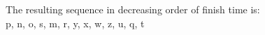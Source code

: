 \documentclass[addpoints,11pt]{exam}
\begin{document}
\begin{questions}
\begin{solutionorbox}
The resulting sequence in decreasing order of finish time is:\\
p, n, o, s, m, r, y, x, w, z, u, q, t\\

\end{solutionorbox}

\ifprintanswers
\newpage
\else
\bigskip
\fi




\end{questions}
\end{document}
